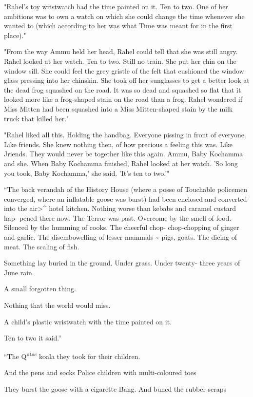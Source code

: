 \documentclass[letterpaper]{article}
\begin{document}
"Rahel's toy wristwatch had the time painted on it. Ten to two. One of
her ambitions was to own a watch on which she could change the time
whenever she wanted to (which according to her was what Time was meant
for in the first place)."

"From the way Ammu held her head, Rahel could tell that she was still
angry. Rahel looked at her watch. Ten to two. Still no train. She put
her chin on the window sill. She could feel the grey gristle of the felt
that cushioned the window glass pressing into her chinskin. She took off
her sunglasses to get a better look at the dead frog squashed on the
road. It was so dead and squashed so flat that it looked more like a
frog-shaped stain on the road than a frog. Rahel wondered if Miss Mitten
had been squashed into a Miss Mitten-shaped stain by the milk truck that
killed her."

"Rahel liked all this. Holding the handbag. Everyone pissing in front of
everyone. Like friends. She knew nothing then, of how precious a feeling
this was. Like Jriends. They would never be together like this again.
Ammu, Baby Kochamma and she. When Baby Kochamma finished, Rahel looked
at her watch. 'So long you took, Baby Kochamma,' she said. 'It's ten to
two.'"

“The back verandah of the History House (where a posse of Touchable
policemen converged, where an inflatable goose was burst) had been
enclosed and converted into the air>\^{} hotel kitchen. Nothing worse than
kebabs and caramel custard hap- pened there now. The Terror was past.
Overcome by the smell of food. Silenced by the humming of cooks. The
cheerful chop- chop-chopping of ginger and garlic. The disembowelling of
lesser mammals \textasciitilde{} pigs, goats. The dicing of meat. The scaling of fish.

Something lay buried in the ground. Under grass. Under twenty- three
years of June rain.

A small forgotten thing.

Nothing that the world would miss.

A child's plastic wristwatch with the time painted on it.

Ten to two it said.”

“The Q\textsuperscript{ntas} koala they took for their children.

And the pens and socks Police children with multi-coloured toes

They burst the goose with a cigarette Bang. And buncd the rubber scraps
\end{document}
